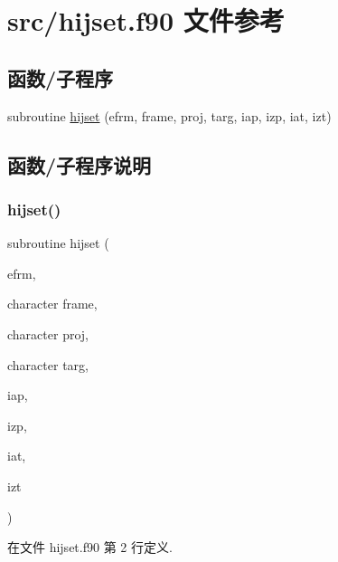 \hypertarget{hijset_8f90}{}\section{src/hijset.f90 文件参考}
\label{hijset_8f90}
\subsection*{函数/子程序}
\begin{DoxyCompactItemize}
\item 
subroutine \mbox{\hyperlink{hijset_8f90_a5b6edaf42645e73a502c3b60ce32d536}{hijset}} (efrm, frame, proj, targ, iap, izp, iat, izt)
\end{DoxyCompactItemize}


\subsection{函数/子程序说明}
\mbox{\label{hijset_8f90_a5b6edaf42645e73a502c3b60ce32d536}} 
\subsubsection{\texorpdfstring{hijset()}{hijset()}}
{\footnotesize\ttfamily subroutine hijset (\begin{DoxyParamCaption}\item[{}]{efrm,  }\item[{character}]{frame,  }\item[{character}]{proj,  }\item[{character}]{targ,  }\item[{}]{iap,  }\item[{}]{izp,  }\item[{}]{iat,  }\item[{}]{izt }\end{DoxyParamCaption})}



在文件 hijset.\+f90 第 2 行定义.

